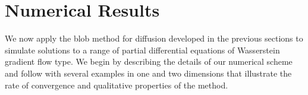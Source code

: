 \documentclass[11pt,leqno]{amsart}
\theoremstyle{definition}
\newcommand{\be}{\begin{equation}}
\newcommand{\ee}{\end{equation}}
\newcommand{\bes}{\begin{equation*}}
\newcommand{\ees}{\end{equation*}}
\newcommand{\R}{{\mathord{\mathbb R}}}
\def\P{{\mathcal P}}
\def\e{\varepsilon}
\begin{document}
%

\section{Numerical Results}

We now apply the blob method for diffusion developed in the previous sections to simulate solutions to a range of partial differential equations of Wasserstein gradient flow type. We begin by describing the details of our numerical scheme and follow with several examples in one and two dimensions that illustrate the rate of convergence and qualitative properties of the method.
\end{document}
